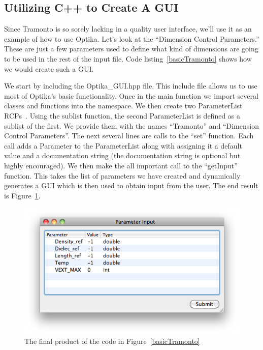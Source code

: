 \subsection{Utilizing C++ to Create A GUI}
Since Tramonto is so sorely lacking in a quality user interface, we'll use it as an example of how to use Optika.
Let's look at the ``Dimension Control Parameters.'' These are just a few parameters used to define what kind of
dimensions are going to be used in the rest of the input file. Code listing~\ref{basicTramonto} shows how we would create
such a GUI.

We start by including the Optika\_GUI.hpp file. This include file allows us to use most of Optika's basic functionality.
Once in the main function we import several classes and functions into the namespace. We then create two
ParameterList RCPs~\cite{RCP}. Using the sublist function, the second 
ParameterList is defined as a sublist of the first. We provide them with the names ``Tramonto'' and
``Dimension Control Parameters''. The next several lines are calls to the ``set'' function. Each call
adds a Parameter to the ParameterList along with assigning it a default value and a documentation string (the 
documentation string is optional but highly encouraged). We then make
the all important call to the ``getInput'' function. This takes the list of parameters we have created and dynamically
generates a GUI which is then used to obtain input from the user. The end result is Figure~\ref{BasicTramontoScreenshot}.
\begin{figure}
\centering
\includegraphics[scale=0.5]{graphics/BasicTramontoScreenshot}
\caption{The final product of the code in Figure~\ref{basicTramonto}}
\label{BasicTramontoScreenshot}
\end{figure}

